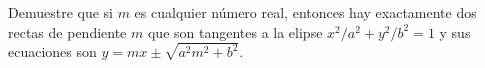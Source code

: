 \item Demuestre que si $m$ es cualquier número real, entonces hay exactamente dos rectas de pendiente $m$ que son tangentes a la elipse $x^2/a^2 + y^2/b^2 = 1$ y sus ecuaciones son $y = mx \pm \sqrt{a^2m^2 + b^2}$.
